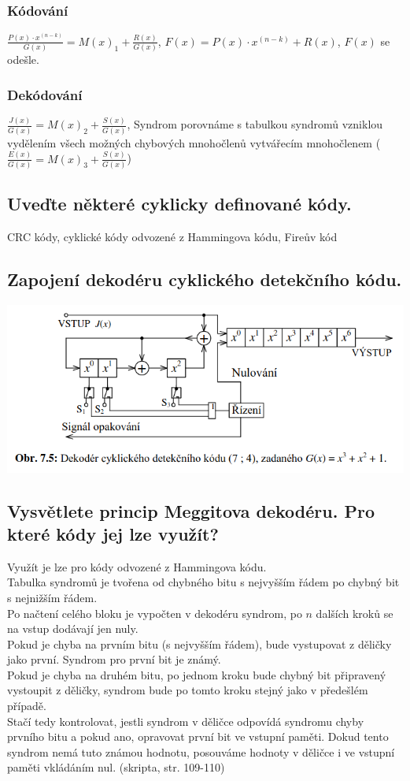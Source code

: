 \subsubsection{Kódování}
$\frac{P(x)\cdot x^{(n-k)}}{G(x)}=M(x)_1+\frac{R(x)}{G(x)}$, $F(x)=P(x)\cdot x^{(n-k)}+R(x)$, $F(x)$ se odešle.
\subsubsection{Dekódování}
$\frac{J(x)}{G(x)}=M(x)_2+\frac{S(x)}{G(x)}$, Syndrom porovnáme s tabulkou syndromů vzniklou vydělením všech možných
chybových mnohočlenů vytvářecím mnohočlenem ($\frac{E(x)}{G(x)}=M(x)_3+\frac{S(x)}{G(x)}$)

\subsection{Uveďte některé cyklicky definované kódy.}
CRC kódy, cyklické kódy odvozené z Hammingova kódu, Fireův kód 

\subsection{Zapojení dekodéru cyklického detekčního kódu.}
\includegraphics[width=16cm]{images/7_dekoder.png}

\subsection{Vysvětlete princip Meggitova dekodéru. Pro které kódy jej lze využít?}
Využít je lze pro kódy odvozené z Hammingova kódu.\\
Tabulka syndromů je tvořena od chybného bitu s nejvyšším řádem po chybný bit s nejnižším řádem.\\
Po načtení celého bloku je vypočten v dekodéru syndrom, po $n$ dalších kroků se na vstup dodávají jen nuly.\\
Pokud je chyba na prvním bitu (s nejvyšším řádem), bude vystupovat z děličky jako první. Syndrom 
pro první bit je známý.\\
Pokud je chyba na druhém bitu, po jednom kroku bude chybný bit připravený vystoupit z děličky, syndrom bude po tomto
kroku stejný jako v předešlém případě.\\
Stačí tedy kontrolovat, jestli syndrom v děličce odpovídá syndromu chyby prvního bitu a pokud ano, opravovat první bit
ve vstupní paměti. Dokud tento syndrom nemá tuto známou hodnotu, posouváme hodnoty v děličce i ve vstupní paměti 
vkládáním nul. (skripta, str. 109-110)


